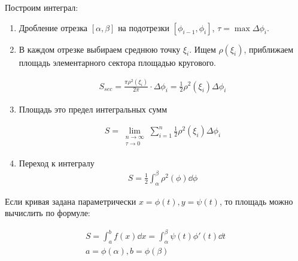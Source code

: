 
\begin{twocolumns}
  
  \columnbreak

  Построим интеграл:
  \begin{enumerate}
    \item Дробление отрезка \([\alpha, \beta]\) на подотрезки
      \([\phi_{i - 1}, \phi_{i}]\), \(\tau = \max \Delta \phi_{i}\).

    \item В каждом отрезке выбираем среднюю точку \(\xi_{i}\). Ищем
      \(\rho(\xi_{i})\), приближаем площадь элементарного сектора площадью
      кругового.
    
      \begin{align*}
        S_{sec}
        = \frac{\pi \rho^2(\xi_{i})}{2 \pi} \cdot \Delta \phi_{i}
        = \frac{1}{2} \rho^2(\xi_{i}) \Delta \phi_{i}
      \end{align*}

    \item Площадь это предел интегральных сумм
    
    \begin{align*}
      S = \lim_{\substack{n \to \infty \\ \tau \to 0}}
        \sum_{i = 1}^{n} \frac{1}{2} \rho^2(\xi_{i}) \Delta \phi_{i}
    \end{align*}
    
    \item Переход к интегралу
    \begin{align*}
      S = \frac{1}{2} \int_{\alpha}^{\beta} \rho^2(\phi) \dd \phi
    \end{align*}
  \end{enumerate}
\end{twocolumns}

\begin{remark}
  Если кривая задана параметрически \(x = \phi(t), y = \psi(t)\), то площадь
  можно вычислить по формуле:

  \begin{align*}
    S
    = \int_{a}^{b} f(x) \dd x
    = \int_{\alpha}^{\beta} \psi(t) \phi'(t) \dd t \\
    a = \phi(\alpha), b = \phi(\beta)
  \end{align*}
\end{remark}
